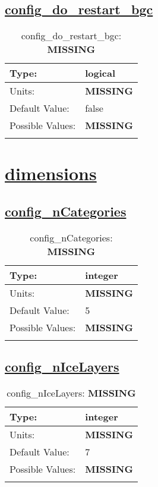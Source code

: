 \subsection[config\_do\_restart\_bgc]{\hyperref[sec:nm_tab_restart]{config\_do\_restart\_bgc}}
\label{subsec:nm_sec_config_do_restart_bgc}
\begin{center}
\begin{longtable}{| p{2.0in} || p{4.0in} |}
    \hline
    Type: & logical \\
    \hline
    Units: & {\bf \color{red} MISSING} \\
    \hline
    Default Value: & false \\
    \hline
    Possible Values: & {\bf \color{red} MISSING} \\
    \hline
    \caption{config\_do\_restart\_bgc: {\bf \color{red} MISSING}}
\end{longtable}
\end{center}
\section[dimensions]{\hyperref[sec:nm_tab_dimensions]{dimensions}}
\label{sec:nm_sec_dimensions}
\subsection[config\_nCategories]{\hyperref[sec:nm_tab_dimensions]{config\_nCategories}}
\label{subsec:nm_sec_config_nCategories}
\begin{center}
\begin{longtable}{| p{2.0in} || p{4.0in} |}
    \hline
    Type: & integer \\
    \hline
    Units: & {\bf \color{red} MISSING} \\
    \hline
    Default Value: & 5 \\
    \hline
    Possible Values: & {\bf \color{red} MISSING} \\
    \hline
    \caption{config\_nCategories: {\bf \color{red} MISSING}}
\end{longtable}
\end{center}
\subsection[config\_nIceLayers]{\hyperref[sec:nm_tab_dimensions]{config\_nIceLayers}}
\label{subsec:nm_sec_config_nIceLayers}
\begin{center}
\begin{longtable}{| p{2.0in} || p{4.0in} |}
    \hline
    Type: & integer \\
    \hline
    Units: & {\bf \color{red} MISSING} \\
    \hline
    Default Value: & 7 \\
    \hline
    Possible Values: & {\bf \color{red} MISSING} \\
    \hline
    \caption{config\_nIceLayers: {\bf \color{red} MISSING}}
\end{longtable}
\end{center}
